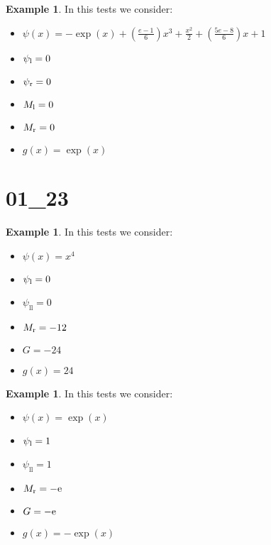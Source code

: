 \documentclass[11pt,a4paper]{article}
\theoremstyle{plain}
\theoremstyle{definition}
\newtheorem{exmp}[thm]{Example} %
\begin{document}
\begin{exmp}
\label{Example:PRO:bending:02_02_glob2v2}
In this tests we consider:
\begin{itemize}
\item $\psi(x)=-\exp(x)+\left(\frac{e-1}{6}\right)x^3+\frac{x^2}{2}+\left(\frac{5e-8}{6}\right)x+1$
\item $\psi_\text l=0$
\item $\psi_\text r=0$
\item $M_\text l=0$
\item $M_\text r=0$
\item $g(x)=\exp(x)$
\end{itemize}
\end{exmp}
%
%
%
\pagebreak
\section{01\_23}

\begin{exmp}
\label{Example:PRO:bending:01_23_glob3v2}
In this tests we consider:
\begin{itemize}
\item $\psi(x)=x^4$
\item $\psi_\text l=0$
\item $\psi_\text{ll}=0$
\item $M_\text r=-12$
\item $G=-24$
\item $g(x)=24$
\end{itemize}
\end{exmp}
%
%
%
\pagebreak

\begin{exmp}
\label{Example:PRO:bending:01_23_glob1v2}
In this tests we consider:
\begin{itemize}
\item $\psi(x)=\exp(x)$
\item $\psi_\text l=1$
\item $\psi_\text{ll}=1$
\item $M_\text r=-\text e$
\item $G=-\text e$
\item $g(x)=-\exp(x)$
\end{itemize}
\end{exmp}
%
%
%
\pagebreak
\end{document}
